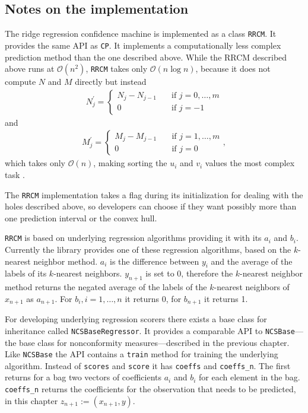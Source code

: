 \documentclass[twoside,11pt]{article}
\begin{document}
\subsection*{Notes on the implementation}

The ridge regression confidence machine is implemented as
a class \texttt{RRCM}. It provides the same API as
\texttt{CP}. It implements a computationally less complex
prediction method than the one described above. While the
RRCM described above runs at $\mathcal{O}(n^2)$,
\texttt{RRCM} takes only $\mathcal{O}(n \log n)$, because it
does not compute $N$ and $M$ directly but instead
\begin{align*}
N_{j}^\prime =
  \begin{cases}
    N_j - N_{j-1} &\quad \text{if } j=0,\dots,m \\
    0             &\quad \text{if } j=-1
  \end{cases}
\end{align*}
and
\begin{align*}
M_{j}^\prime =
  \begin{cases}
    M_j - M_{j-1} &\quad \text{if } j=1,\dots,m \\
    0             &\quad \text{if } j=0
  \end{cases},
\end{align*}
which takes only $\mathcal{O}(n)$, making sorting the
$u_i$ and $v_i$ values the most complex task
\citep[see][Chapter 2.3]{alrw}.

The \texttt{RRCM} implementation takes a flag during
its initialization for dealing with the holes described
above, so developers can choose if they want possibly more
than one prediction interval or the convex hull.

\texttt{RRCM} is based on underlying regression algorithms
providing it with its $a_i$ and $b_i$. Currently the
library provides one of these regression algorithms, based
on the $k$-nearest neighbor method.
$a_i$ is the difference between $y_i$ and the average of
the labels of its $k$-nearest neighbors. $y_{n+1}$ is set
to 0, therefore the $k$-nearest neighbor method returns the
negated average of the labels of the $k$-nearest neighbors
of $x_{n+1}$ as $a_{n+1}$.
For $b_i, i=1,\dots,n$ it returns 0, for $b_{n+1}$ it
returns 1.

For developing underlying regression scorers there exists
a base class for inheritance called
\texttt{NCSBaseRegressor}.
It provides a comparable API to \texttt{NCSBase}---the
base class for nonconformity measures---described
in the previous chapter.
Like \texttt{NCSBase} the API contains a \texttt{train}
method for training the underlying algorithm.
Instead of \texttt{scores} and \texttt{score} it has
\texttt{coeffs} and \texttt{coeffs\_n}. The first returns
for a bag two vectors of coefficients $a_i$ and $b_i$ for
each element in the bag. \texttt{coeffs\_n} returns
the coefficients for the observation that needs to be
predicted, in this chapter $z_{n+1} := (x_{n+1},y)$.
\end{document}
